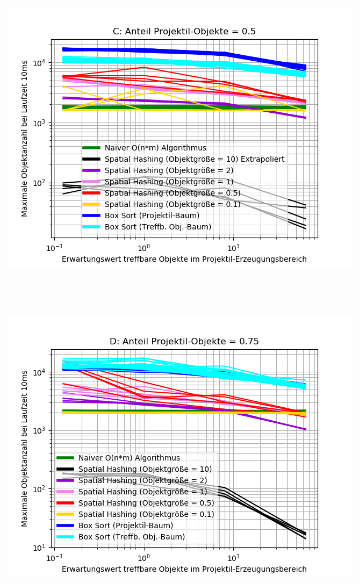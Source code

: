\begin{figure}
\begin{subfigure}[t]{0.55\textwidth}
		\label{fig:shotgunComparison-B}
	\end{subfigure}
~
	\begin{subfigure}[t]{0.55\textwidth}
		\centering
		\includegraphics[width=1\textwidth]{./res/shotgunComparison-C.png}

		\label{fig:shotgunComparison-C}
	\end{subfigure}
~
	\begin{subfigure}[t]{0.55\textwidth}
		\centering
		\includegraphics[width=1\textwidth]{./res/shotgunComparison-D.png}


\end{subfigure}
\end{figure}
